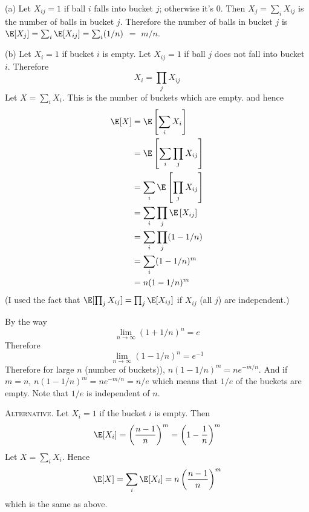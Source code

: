 
(a)
Let $X_{ij} = 1$ if ball $i$ falls into bucket $j$; otherwise it's 0.
Then $X_j = \sum_{i} X_{ij}$
is the number of balls in bucket $j$.
Therefore the number of balls in bucket $j$ is
$\E[X_j] = \sum_{i} \E[X_{ij}] = \sum_{i} (1/n)$ $=$ $m/n$.  

(b)
Let $X_i = 1$ if bucket $i$ is empty.
Let $X_{ij} = 1$ if ball $j$ does not fall into bucket $i$.
Therefore
\[
  X_i = \prod_{j} X_{ij}
\]
Let $X = \sum_i {X_i}$. This is the number of buckets which are empty.
and hence
\begin{align*}
  \E[X]
  &= \E \left[ \sum_{i} X_i \right]
    \\
  &= \E \left[ \sum_i \prod_{j} X_{ij} \right]
    \\
  &= \sum_i \E \left[  \prod_{j} X_{ij} \right]
    \\
  &= \sum_i \prod_{j} \E \left[  X_{ij} \right]
    \\
  &= \sum_i \prod_{j} (1 - 1/n)
    \\
  &= \sum_i (1 - 1/n)^m
    \\
  &= n (1 - 1/n)^m
\end{align*}
(I used the fact that
$\E[\prod_j X_{ij}] = \prod_j \E[X_{ij}]$ if
$X_{ij}$ (all $j$)
are independent.)

By the way
\[
  \lim_{n \rightarrow \infty} (1 + 1/n)^n = e
\]
Therefore
\[
  \lim_{n \rightarrow \infty} (1 - 1/n)^n = e^{-1}
\]
Therefore for large $n$ (number of buckets)),
$n (1 - 1/n)^m = ne^{-m/n}$.
And if $m = n$, 
$n (1 - 1/n)^m = ne^{-m/n} = n/e$
which means that $1/e$ of the buckets are empty.
Note that $1/e$ is independent of $n$.


\textsc{Alternative}.
Let $X_i = 1$ if the bucket $i$ is empty.
Then
\[
  \E[X_i] = \left( \frac{n-1}{n} \right)^m = \left( 1 - \frac{1}{n} \right)^m
\]
Let $X = \sum_{i}X_i$.
Hence
\[
  \E[X] = \sum_{i} \E[X_i] = n \left( \frac{n-1}{n} \right)^m
\]
which is the same as above.


\begin{comment}
(c)
Let $X_i = 1$ if is has more than one ball.
Then
\[
  \E[X_i] = 1 - 1/n - 
\]
\end{comment}

    
